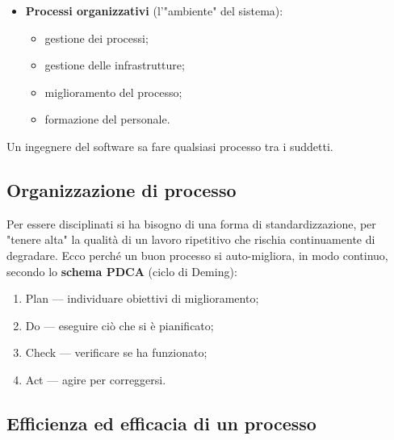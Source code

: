 \documentclass[a4paper]{article}
\begin{document}
\begin{itemize}
\begin{itemize}
	\end{itemize}

			
			
	\item \textbf{Processi organizzativi} (l'"ambiente" del sistema):
				
	\begin{itemize}
		
					
	\item gestione dei processi;
					
	\item gestione delle infrastrutture;
					
	\item miglioramento del processo;
					
	\item formazione del personale.
				
	\end{itemize}

			
		
	\end{itemize}

		
Un ingegnere del software sa fare qualsiasi processo tra i suddetti.

		
	\subsection{Organizzazione di processo}

		
Per essere disciplinati si ha bisogno di una forma di standardizzazione, per "tenere alta" la qualità di un lavoro ripetitivo che rischia continuamente di degradare. Ecco perché un buon processo si auto-migliora, in modo continuo, secondo lo \textbf{schema PDCA} (ciclo di Deming):
		
	\begin{enumerate}
		
			
	\item Plan — individuare obiettivi di miglioramento;
			
	\item Do — eseguire ciò che si è pianificato;
			
	\item Check — verificare se ha funzionato;
			
	\item Act — agire per correggersi.
		
	\end{enumerate}


		
	\subsection{Efficienza ed efficacia di un processo}
\end{document}
